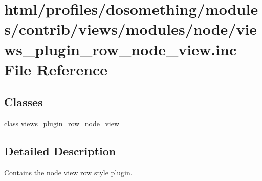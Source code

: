 \hypertarget{views__plugin__row__node__view_8inc}{
\section{html/profiles/dosomething/modules/contrib/views/modules/node/views\_\-plugin\_\-row\_\-node\_\-view.inc File Reference}
\label{views__plugin__row__node__view_8inc}
}
\subsection*{Classes}
\begin{DoxyCompactItemize}
\item 
class \hyperlink{classviews__plugin__row__node__view}{views\_\-plugin\_\-row\_\-node\_\-view}
\end{DoxyCompactItemize}


\subsection{Detailed Description}
Contains the node \hyperlink{classview}{view} row style plugin. 